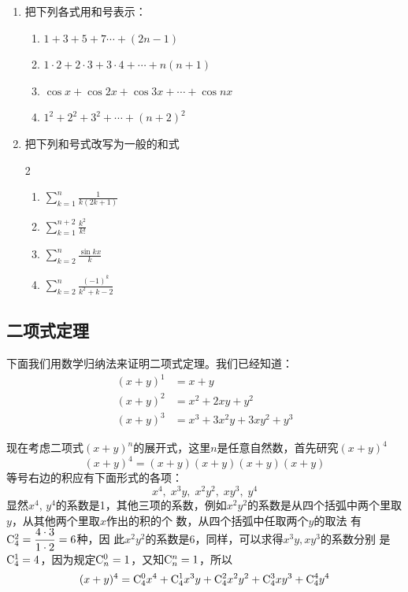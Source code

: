 \begin{ex}
\begin{enumerate}
    \item 把下列各式用和号表示：
\begin{enumerate}[(1)]
\item $1+3+5+7\cdots+(2n-1)$ 
\item $1\cdot2+2\cdot3+3\cdot4+\cdots+n(n+1)$ 
\item $\cos x+\cos2x+\cos3x+\cdots+\cos nx$
\item $1^{2}+2^{2}+3^{2}+\cdots+(n+2)^{2}$
\end{enumerate}

\item 把下列和号式改写为一般的和式
\begin{multicols}{2}
\begin{enumerate}[(1)]
\item $\sum\limits _{k= 1}^{n}\frac 1{k( 2k+ 1) }$ 
\item $\sum\limits _{k= 1}^{n+ 2}\frac {k^{2}}{k! }$
\item $\sum\limits^n_{k=2}\frac{\sin kx}{k}$
\item $\sum\limits^n_{k=2}\frac{(-1)^k}{k^2+k-2}$
\end{enumerate}
\end{multicols}
\end{enumerate}
\end{ex}

\subsection{二项式定理}
下面我们用数学归纳法来证明二项式定理。我们已经知道：
\[\begin{split}
(x+y)^1&=x+y\\
(x+y)^2&=x^2+2xy+y^2\\
(x+y)^3&=x^3+3x^2y+3xy^2+y^3    
\end{split}\]

现在考虑二项式$(x+y)^n$的展开式，这里$n$是任意自然数，首先研究$(x+y)^4$
\[(x+y)^4=(x+y)(x+y)(x+y)(x+y)\]
等号右边的积应有下面形式的各项：
\[x^4,\; x^3y,\; x^2y^2,\; xy^3,\; y^4\]
显然$x^4$, $y^4$的系数是1，其他三项的系数，例如$x^2y^2$的系数是从四个括弧中两个里取$y$，从其他两个里取$x$作出的积的个
数，从四个括弧中任取两个$y$的取法 有${\rm C}^{2}_{4}=\dfrac{4\cdot 3}{1\cdot 2}=6$种，因
此$x^2y^2$的系数是6，同样，可以求得$x^3y,xy^3$的系数分别
是${\rm C}^{1}_{4}=4$，因为规定${\rm C}^{0}_{n}=1$，又知${\rm C}^{n}_{n}=1$，所以
\[(x+y)^4={\rm C}^{0}_{4}x^4+{\rm C}^{1}_{4}x^3y+{\rm C}^{2}_{4}x^2y^2+{\rm C}^{3}_{4}xy^3+{\rm C}^{4}_{4}y^4\]

